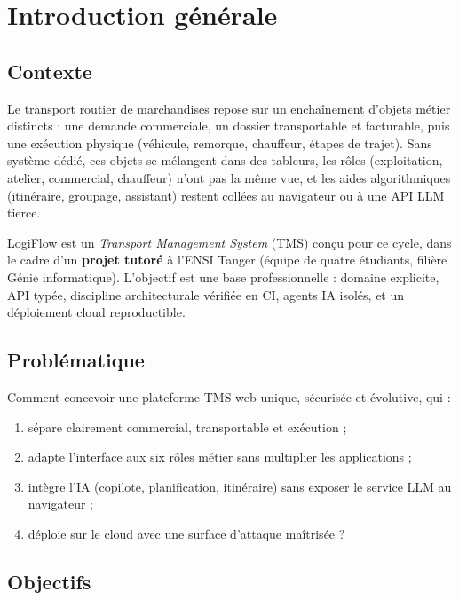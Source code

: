 \chapter{Introduction générale}
\label{chap:intro}

\section{Contexte}

Le transport routier de marchandises repose sur un enchaînement d'objets métier distincts : une demande commerciale, un dossier transportable et facturable, puis une exécution physique (véhicule, remorque, chauffeur, étapes de trajet). Sans système dédié, ces objets se mélangent dans des tableurs, les rôles (exploitation, atelier, commercial, chauffeur) n'ont pas la même vue, et les aides algorithmiques (itinéraire, groupage, assistant) restent collées au navigateur ou à une API LLM tierce.

LogiFlow est un \emph{Transport Management System} (TMS) conçu pour ce cycle, dans le cadre d'un \textbf{projet tutoré} à l'ENSI Tanger (équipe de quatre étudiants, filière Génie informatique). L'objectif est une base professionnelle : domaine explicite, API typée, discipline architecturale vérifiée en CI, agents IA isolés, et un déploiement cloud reproductible.

\section{Problématique}

Comment concevoir une plateforme TMS web unique, sécurisée et évolutive, qui :
\begin{enumerate}[leftmargin=*]
  \item sépare clairement commercial, transportable et exécution ;
  \item adapte l'interface aux six rôles métier sans multiplier les applications ;
  \item intègre l'IA (copilote, planification, itinéraire) sans exposer le service LLM au navigateur ;
  \item déploie sur le cloud avec une surface d'attaque maîtrisée ?
\end{enumerate}

\section{Objectifs}

